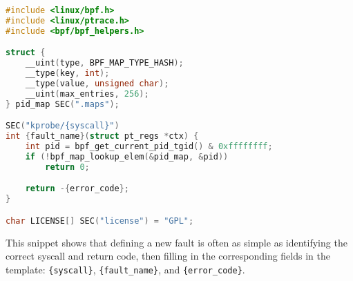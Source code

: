 \begin{lstlisting}[language=C,caption={Minimal eBPF template for injecting syscall-level faults},label={lst:fault_template}]
#include <linux/bpf.h>
#include <linux/ptrace.h>
#include <bpf/bpf_helpers.h>

struct {
    __uint(type, BPF_MAP_TYPE_HASH);
    __type(key, int);
    __type(value, unsigned char);
    __uint(max_entries, 256);
} pid_map SEC(".maps");

SEC("kprobe/{syscall}")
int {fault_name}(struct pt_regs *ctx) {
    int pid = bpf_get_current_pid_tgid() & 0xffffffff;
    if (!bpf_map_lookup_elem(&pid_map, &pid))
        return 0;

    return -{error_code};
}

char LICENSE[] SEC("license") = "GPL";
\end{lstlisting}

This snippet shows that defining a new fault is often as simple as identifying the correct syscall and return code, then filling in the corresponding fields in the template: \texttt{\{syscall\}}, \texttt{\{fault\_name\}}, and \texttt{\{error\_code\}}.

